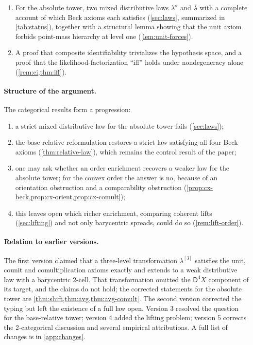 \documentclass[11pt]{article}
\theoremstyle{definition}
\theoremstyle{remark}
\newcommand{\D}{\mathsf{D}}
\newcommand{\lb}{\bar\lambda}
\newcommand{\ls}{\lambda^{\sigma}}
\begin{document}
\begin{enumerate}[leftmargin=*]
  unmodeled contamination with a certified lower bound on the unmodeled weight
  (\cref{sec:ident,sec:contam}).
\item For the absolute tower, two mixed distributive laws $\ls$ and $\lb$ with a complete account
  of which Beck axioms each satisfies (\cref{sec:laws}, summarized in \cref{tab:status}), together with a structural lemma
  showing that the unit axiom forbids point-mass hierarchy at level one (\cref{lem:unit-forces}).
\item A proof that composite identifiability trivializes the hypothesis space, and a proof that the
  likelihood-factorization ``iff'' holds under nondegeneracy alone (\cref{rem:ci,thm:iff}).
\end{enumerate}

\paragraph{Structure of the argument.} The categorical results form a progression:
\begin{enumerate}[label=(\arabic*),leftmargin=*]
\item a strict mixed distributive law for the absolute tower fails (\cref{sec:laws});
\item the base-relative reformulation restores a strict law satisfying all four Beck axioms
  (\cref{thm:relative-law}), which remains the control result of the paper;
\item one may ask whether an order enrichment recovers a weaker law for the absolute tower; for the
  convex order the answer is no, because of an orientation obstruction and a comparability
  obstruction (\cref{prop:cx-beck,prop:cx-orient,prop:cx-comult});
\item this leaves open which richer enrichment, comparing coherent lifts (\cref{sec:lifting}) and not
  only barycentric spreads, could do so (\cref{rem:lift-order}).
\end{enumerate}

\paragraph{Relation to earlier versions.} The first version claimed that a three-level
transformation $\lambda^{[3]}$ satisfies the unit, counit and comultiplication axioms exactly and
extends to a weak distributive law with a barycentric 2-cell. That transformation omitted the
$\D^4X$ component of its target, and the claims do not hold; the corrected statements for the
absolute tower are \cref{thm:shift,thm:avg,thm:avg-comult}. The second version corrected the typing
but left the existence of a full law open. Version 3 resolved the question for the base-relative
tower; version 4 added the lifting problem; version 5 corrects the 2-categorical discussion and
several empirical attributions. A full list of changes is in \cref{app:changes}.
\end{document}
